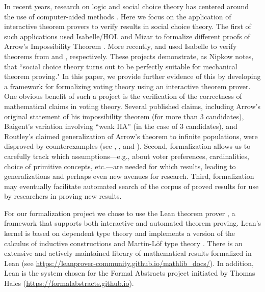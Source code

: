 \documentclass[runningheads]{llncs}
\begin{document}
In recent years, research on  logic and social choice theory has centered around the use of computer-aided methods \cite{Geist2017}.  Here we focus on the application of interactive theorem provers to verify results in social choice theory.   The first of such applications used Isabelle/HOL  \cite{Nipkow2009} and Mizar \cite{Wiedijk2007} to formalize different proofs of  Arrow's Impossibility Theorem \cite{Geanakoplos2005}.  More recently, \cite{Brandt2018b} and \cite{Eberl2019} used Isabelle to verify theorems from \cite{Brandt2018} and \cite{Brandl2018}, respectively.  These projects demonstrate, as Nipkow \cite{Nipkow2009} notes,  that ``social choice theory turns out to be perfectly suitable for mechanical theorem proving."  In this paper, we provide further evidence of this by developing a framework for formalizing voting theory using an interactive theorem prover. One obvious benefit of such a project is the verification of the correctness of mathematical claims in voting theory. Several published claims, including Arrow's \cite{Arrow1951} original statement of his impossibility theorem (for more than 3 candidates), Baigent's \cite{Baigent1987} variation involving ``weak IIA'' (in the case of 3 candidates), and Routley's \cite{Routley1979} claimed generalization of Arrow's theorem to infinite populations, were disproved by counterexamples (see \cite{Blau1957}, \cite{Campbell2000}, and \cite{Blau1979}). Second, formalization allows us to carefully track  which assumptions---e.g., about voter preferences, cardinalities, choice of primitive concepts, etc.---are needed for which results, leading to generalizations and perhaps even new avenues for research. Third, formalization may eventually facilitate automated search of the corpus of proved results for use by researchers in proving new results.


For our formalization project we chose to use the Lean theorem prover \cite{Lean}, a framework that supports both interactive and automated theorem proving.   Lean's kernel is based on dependent type theory and   implements a version of the calculus of inductive constructions \cite{Coquand1988}  and Martin-L\"of type theory \cite{MartinLof1984}. There is an extensive and actively maintained  library of mathematical results formalized in Lean (see \url{https://leanprover-community.github.io/mathlib_docs/}). In addition, Lean is the system chosen for the Formal Abstracts project initiated by Thomas Hales (\url{https://formalabstracts.github.io}). %
 
\end{document}

